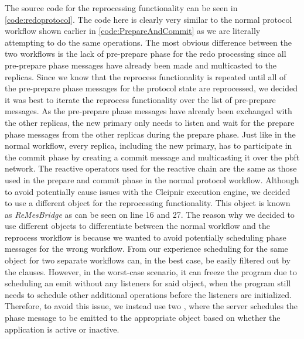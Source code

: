 The source code for the reprocessing functionality can be seen in \autoref{code:redoprotocol}. The code here is clearly very similar to the normal protocol workflow shown earlier in \autoref{code:PrepareAndCommit} as we are literally attempting to do the same operations. The most obvious difference between the two workflows is the lack of pre-prepare phase for the redo processing since all pre-prepare phase messages have already been made and multicasted to the replicas. Since we know that the reprocess functionality is repeated until all of the pre-prepare phase messages for the protocol state are reprocessed, we decided it was best to iterate the reprocess functionality over the list of pre-prepare messages. As the pre-prepare phase messages have already been exchanged with the other replicas, the new primary only needs to listen and wait for the prepare phase messages from the other replicas during the prepare phase. Just like in the normal workflow, every replica, including the new primary, has to participate in the commit phase by creating a commit message and multicasting it over the \ac{pbft} network. The reactive operators used for the reactive chain are the same as those used in the prepare and commit phase in the normal protocol workflow. Although to avoid potentially cause issues with the Cleipnir execution engine, we decided to use a different  object for the reprocessing functionality. This  object is known as \emph{ReMesBridge} as can be seen on line 16 and 27. The reason why we decided to use different  objects to differentiate between the normal workflow and the reprocess workflow is because we wanted to avoid potentially scheduling phase messages for the wrong workflow. From our experience scheduling for the same  object for two separate workflows can, in the best case, be easily filtered out by the  clauses. However, in the worst-case scenario, it can freeze the program due to scheduling an emit without any listeners for said  object, when the program still needs to schedule other additional operations before the listeners are initialized. Therefore, to avoid this issue, we instead use two , where the server schedules the phase message to be emitted to the appropriate  object based on whether the application is active or inactive. 

